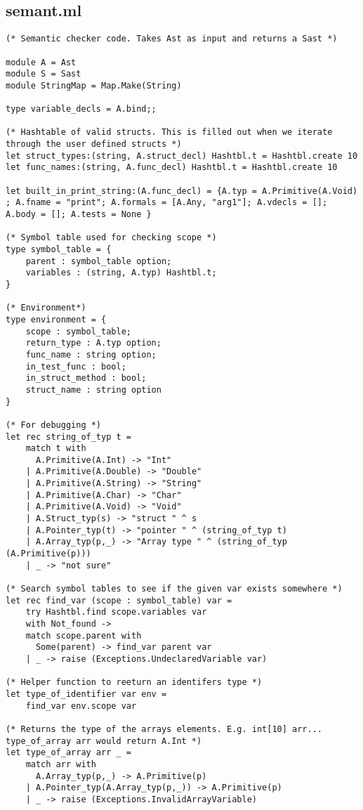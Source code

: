 \documentclass{article}
\begin{document}
\subsection{semant.ml}
\begin{lstlisting}
(* Semantic checker code. Takes Ast as input and returns a Sast *)

module A = Ast
module S = Sast
module StringMap = Map.Make(String)

type variable_decls = A.bind;;

(* Hashtable of valid structs. This is filled out when we iterate through the user defined structs *)
let struct_types:(string, A.struct_decl) Hashtbl.t = Hashtbl.create 10
let func_names:(string, A.func_decl) Hashtbl.t = Hashtbl.create 10

let built_in_print_string:(A.func_decl) = {A.typ = A.Primitive(A.Void) ; A.fname = "print"; A.formals = [A.Any, "arg1"]; A.vdecls = []; A.body = []; A.tests = None }

(* Symbol table used for checking scope *)
type symbol_table = {
	parent : symbol_table option;
	variables : (string, A.typ) Hashtbl.t;
}

(* Environment*)
type environment = {
	scope : symbol_table;
	return_type : A.typ option;
	func_name : string option;
	in_test_func : bool;
	in_struct_method : bool;
	struct_name : string option
}

(* For debugging *)
let rec string_of_typ t =
	match t with
	  A.Primitive(A.Int) -> "Int"
	| A.Primitive(A.Double) -> "Double"
	| A.Primitive(A.String) -> "String"
	| A.Primitive(A.Char) -> "Char"
	| A.Primitive(A.Void) -> "Void"
	| A.Struct_typ(s) -> "struct " ^ s
	| A.Pointer_typ(t) -> "pointer " ^ (string_of_typ t)
	| A.Array_typ(p,_) -> "Array type " ^ (string_of_typ (A.Primitive(p)))
	| _ -> "not sure"

(* Search symbol tables to see if the given var exists somewhere *)
let rec find_var (scope : symbol_table) var =
	try Hashtbl.find scope.variables var
	with Not_found ->
	match scope.parent with
	  Some(parent) -> find_var parent var
	| _ -> raise (Exceptions.UndeclaredVariable var)	

(* Helper function to reeturn an identifers type *)
let type_of_identifier var env = 
	find_var env.scope var

(* Returns the type of the arrays elements. E.g. int[10] arr... type_of_array arr would return A.Int *)
let type_of_array arr _ =
	match arr with
	  A.Array_typ(p,_) -> A.Primitive(p)
	| A.Pointer_typ(A.Array_typ(p,_)) -> A.Primitive(p)
	| _ -> raise (Exceptions.InvalidArrayVariable)


\end{lstlisting}
\end{document}
